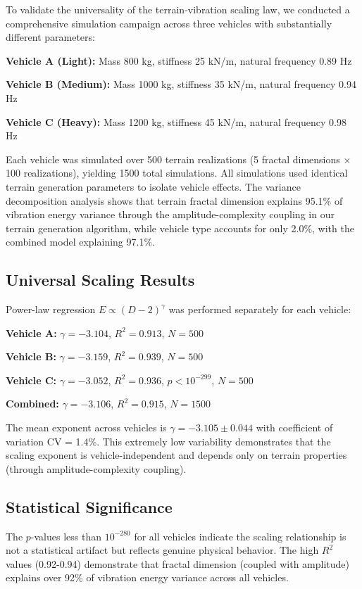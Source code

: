 \documentclass[11pt]{article}
\begin{document}
To validate the universality of the terrain-vibration scaling law, we conducted a comprehensive simulation campaign across three vehicles with substantially different parameters:

\textbf{Vehicle A (Light):} Mass 800 kg, stiffness 25 kN/m, natural frequency 0.89 Hz

\textbf{Vehicle B (Medium):} Mass 1000 kg, stiffness 35 kN/m, natural frequency 0.94 Hz

\textbf{Vehicle C (Heavy):} Mass 1200 kg, stiffness 45 kN/m, natural frequency 0.98 Hz

Each vehicle was simulated over 500 terrain realizations (5 fractal dimensions $\times$ 100 realizations), yielding 1500 total simulations. All simulations used identical terrain generation parameters to isolate vehicle effects. The variance decomposition analysis shows that terrain fractal dimension explains 95.1\% of vibration energy variance through the amplitude-complexity coupling in our terrain generation algorithm, while vehicle type accounts for only 2.0\%, with the combined model explaining 97.1\%.

\subsection{Universal Scaling Results}

Power-law regression $E \propto (D-2)^\gamma$ was performed separately for each vehicle:

\textbf{Vehicle A:} $\gamma = -3.104$, $R^2 = 0.913$, $N = 500$

\textbf{Vehicle B:} $\gamma = -3.159$, $R^2 = 0.939$, $N = 500$

\textbf{Vehicle C:} $\gamma = -3.052$, $R^2 = 0.936$, $p < 10^{-299}$, $N = 500$

\textbf{Combined:} $\gamma = -3.106$, $R^2 = 0.915$, $N = 1500$

The mean exponent across vehicles is $\gamma = -3.105 \pm 0.044$ with coefficient of variation CV = 1.4\%. This extremely low variability demonstrates that the scaling exponent is vehicle-independent and depends only on terrain properties (through amplitude-complexity coupling).

\subsection{Statistical Significance}

The $p$-values less than $10^{-280}$ for all vehicles indicate the scaling relationship is not a statistical artifact but reflects genuine physical behavior. The high $R^2$ values (0.92-0.94) demonstrate that fractal dimension (coupled with amplitude) explains over 92\% of vibration energy variance across all vehicles.
\end{document}
